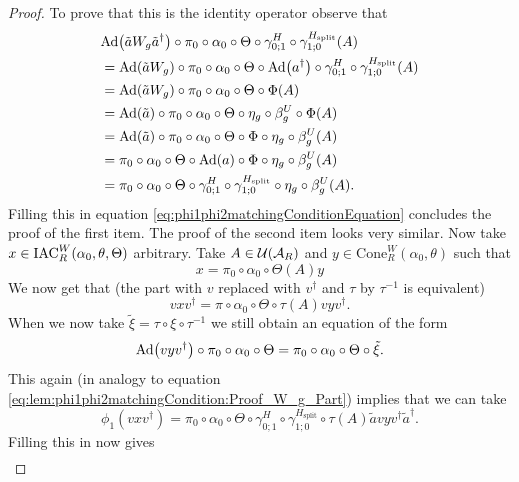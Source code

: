 \documentclass[12pt,a4paper,twoside]{article}
\numberwithin{equation}{section}
\begin{document}
\begin{proof}
	To prove that this is the identity operator observe that
	\begin{align}
		&\Ad{\tilde{a}W_g\tilde{a}^\dagger}\circ\pi_0\circ\alpha_0\circ\Theta\circ \gamma^{H}_{0;1}\circ\gamma^{H_\text{split}}_{1;0}(A)\\
		&=\Ad{\tilde{a}W_g}\circ\pi_0\circ\alpha_0\circ\Theta\circ\Ad{a^\dagger}\circ \gamma^{H}_{0;1}\circ\gamma^{H_\text{split}}_{1;0}(A)\\
		&=\Ad{\tilde{a}W_g}\circ\pi_0\circ\alpha_0\circ\Theta\circ\Phi(A)\\
		&=\Ad{\tilde{a}}\circ\pi_0\circ\alpha_0\circ\Theta\circ\eta_g\circ\beta_g^U\circ\Phi(A)\\
		&=\Ad{\tilde{a}}\circ\pi_0\circ\alpha_0\circ\Theta\circ\Phi\circ\eta_g\circ\beta_g^U(A)\\
		&=\pi_0\circ\alpha_0\circ\Theta\circ\Ad{a}\circ\Phi\circ\eta_g\circ\beta_g^U(A)\\
		&=\pi_0\circ\alpha_0\circ\Theta\circ \gamma^{H}_{0;1}\circ\gamma^{H_\text{split}}_{1;0} \circ\eta_g\circ\beta_g^U(A).
	\end{align}
	Filling this in equation \eqref{eq:phi1phi2matchingConditionEquation} concludes the proof of the first item. The proof of the second item looks very similar. Now take $x\in \textrm{IAC}_R^W(\alpha_0,\theta,\Theta)$ arbitrary. Take $A\in\mathcal U(\mathcal A_R)$ and $y\in\text{Cone}_R^W(\alpha_0,\theta)$ such that
	\begin{equation}
		x=\pi_0\circ\alpha_0\circ\Theta(A)y
	\end{equation}
	We now get that (the part with $v$ replaced with $v^\dagger$ and $\tau$ by $\tau^{-1}$ is equivalent)
	\begin{equation}
		vxv^\dagger=\pi\circ\alpha_0\circ\Theta\circ\tau(A)vyv^\dagger.
	\end{equation}
	When we now take $\tilde\xi=\tau\circ\xi\circ\tau^{-1}$ we still obtain an equation of the form
	\begin{equation}
		\Ad{vyv^\dagger}\circ \pi_0\circ\alpha_0\circ\Theta=\pi_0\circ\alpha_0\circ\Theta\circ\tilde\xi.
	\end{equation}
	This again (in analogy to equation \eqref{eq:lem:phi1phi2matchingCondition:Proof_W_g_Part}) implies that we can take
	\begin{equation}
		\phi_1(vxv^\dagger)=\pi_0\circ\alpha_0\circ\Theta\circ\gamma^{H}_{0;1}\circ\gamma^{H_{\text{split}}}_{1;0}\circ\tau(A)\tilde{a}vyv^\dagger\tilde{a}^\dagger.
	\end{equation}
	Filling this in now gives
	\begin{align}

\end{align}
\end{proof}
\end{document}
